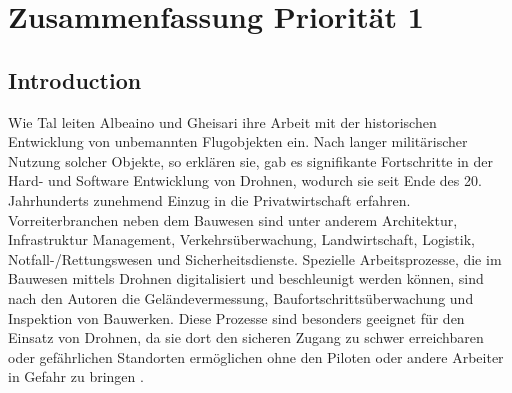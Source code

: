 \chapter{Zusammenfassung Priorität 1}\label{ch:summary2}

\section{Introduction}

Wie Tal leiten Albeaino und Gheisari ihre Arbeit mit der historischen Entwicklung von unbemannten Flugobjekten ein.
Nach langer militärischer Nutzung solcher Objekte, so erklären sie, gab es signifikante Fortschritte in der Hard- und Software Entwicklung von Drohnen, wodurch sie seit Ende des 20. Jahrhunderts zunehmend Einzug in die Privatwirtschaft erfahren.
Vorreiterbranchen neben dem Bauwesen sind unter anderem Architektur, Infrastruktur Management, Verkehrsüberwachung, Landwirtschaft, Logistik, Notfall-/Rettungswesen und Sicherheitsdienste.
Spezielle Arbeitsprozesse, die im Bauwesen mittels Drohnen digitalisiert und beschleunigt werden können, sind nach den Autoren die Geländevermessung, Baufortschrittsüberwachung und Inspektion von Bauwerken.
Diese Prozesse sind besonders geeignet für den Einsatz von Drohnen, da sie dort den sicheren Zugang zu schwer erreichbaren oder gefährlichen Standorten ermöglichen ohne den Piloten oder andere Arbeiter in Gefahr zu bringen \cite[S. 84--85]{abaeano2021trends}.



